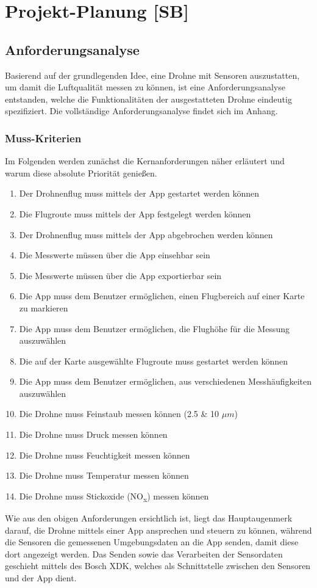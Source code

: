 
\chapter{Projekt-Planung [SB]}\label{cha:Planung}
\section{Anforderungsanalyse}\label{sec:Anforderungsanalyse}
Basierend auf der grundlegenden Idee, eine Drohne mit Sensoren auszustatten, um damit die Luftqualität messen zu können, ist eine Anforderungsanalyse entstanden, welche die Funktionalitäten der ausgestatteten Drohne eindeutig spezifiziert. Die vollständige Anforderungsanalyse findet sich im Anhang.
\subsection{Muss-Kriterien}\label{subsec:MussKrit}
Im Folgenden werden zunächst die Kernanforderungen näher erläutert und warum diese absolute Priorität genießen.
\newline
\begin{enumerate}[label=\roman*.]
	\item Der Drohnenflug muss mittels der App gestartet werden können
	\item Die Flugroute muss mittels der App festgelegt werden können
	\item Der Drohnenflug muss mittels der App abgebrochen werden können
	\item Die Messwerte müssen über die App einsehbar sein
	\item Die Messwerte müssen über die App exportierbar sein
	\item Die App muss dem Benutzer ermöglichen, einen Flugbereich auf einer Karte zu markieren
	\item Die App muss dem Benutzer ermöglichen, die Flughöhe für die Messung auszuwählen
	\item Die auf der Karte ausgewählte Flugroute muss gestartet werden können
	\item Die App muss dem Benutzer ermöglichen, aus verschiedenen Messhäufigkeiten auszuwählen
	\item Die Drohne muss Feinstaub messen können (2.5 \& 10 $\mu m$)
	\item Die Drohne muss Druck messen können
	\item Die Drohne muss Feuchtigkeit messen können
	\item Die Drohne muss Temperatur messen können
	\item Die Drohne muss Stickoxide (NO\textsubscript{x}) messen können	
\end{enumerate}
Wie aus den obigen Anforderungen ersichtlich ist, liegt das Hauptaugenmerk darauf, die Drohne mittels einer App ansprechen und steuern zu können, während die Sensoren die gemessenen Umgebungsdaten an die App senden, damit diese dort angezeigt werden. Das Senden sowie das Verarbeiten der Sensordaten geschieht mittels des Bosch \acf{XDK}, welches als Schnittstelle zwischen den Sensoren und der App dient.
